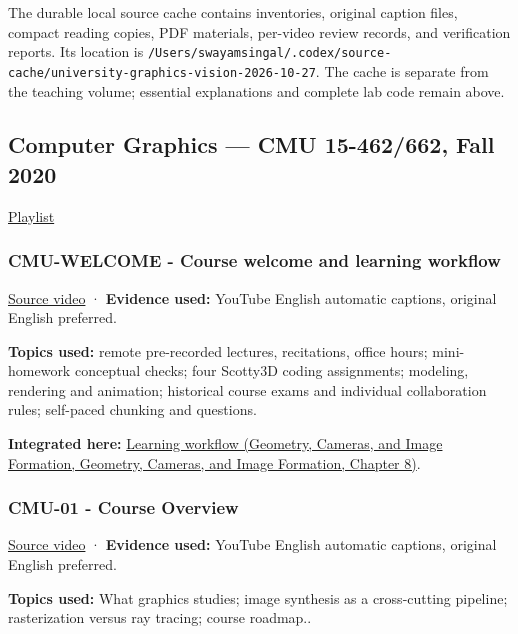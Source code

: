 The durable local source cache contains inventories, original caption files, compact reading copies, PDF materials, per-video review records, and verification reports. Its location is \texttt{/Users/swayamsingal/.codex/source-cache/university-graphics-vision-2026-10-27}. The cache is separate from the teaching volume; essential explanations and complete lab code remain above.

\subsection{Computer Graphics --- CMU 15-462/662, Fall 2020}\label{04-visual-computing-ii-ch036-computer-graphics-cmu-15-462662-fall-2020}

\href{https://www.youtube.com/playlist?list=PL9_jI1bdZmz2emSh0UQ5iOdT2xRHFHL7E}{Playlist}

\subsubsection{CMU-WELCOME - Course welcome and learning workflow}\label{04-visual-computing-ii-ch036-cmu-welcome---course-welcome-and-learning-workflow}

\href{https://www.youtube.com/watch?v=W6yEALqsD7k}{Source video} · \textbf{Evidence used:} YouTube English automatic captions, original English preferred.

\textbf{Topics used:} remote pre-recorded lectures, recitations, office hours; mini-homework conceptual checks; four Scotty3D coding assignments; modeling, rendering and animation; historical course exams and individual collaboration rules; self-paced chunking and questions.

\textbf{Integrated here:} \href{../03-Geometry-Cameras-and-Image-Formation/main.pdf\#nameddest=03-visual-computing-i-ch001-how-to-use-this-volume-without-losing-the-thread}{Learning workflow (Geometry, Cameras, and Image Formation, Geometry, Cameras, and Image Formation, Chapter 8)}.

\subsubsection{CMU-01 - Course Overview}\label{04-visual-computing-ii-ch036-cmu-01---course-overview}

\href{https://www.youtube.com/watch?v=PhxV_JrXeVk}{Source video} · \textbf{Evidence used:} YouTube English automatic captions, original English preferred.

\textbf{Topics used:} What graphics studies; image synthesis as a cross-cutting pipeline; rasterization versus ray tracing; course roadmap..

